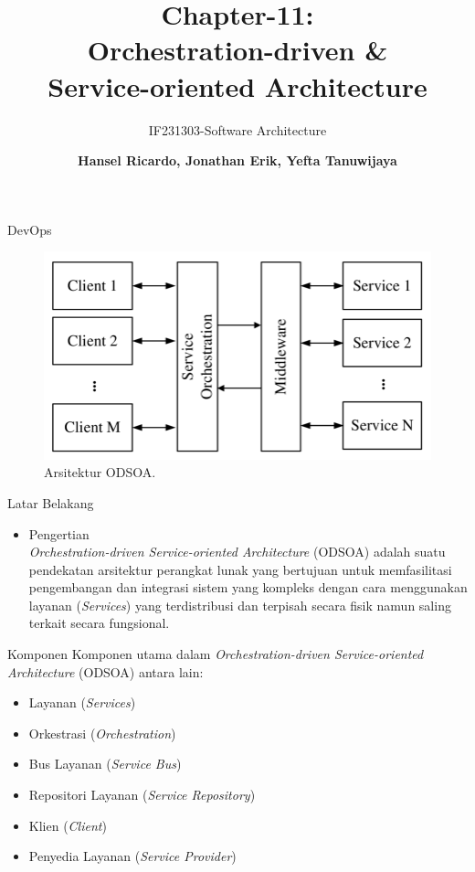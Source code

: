 \documentclass[aspectratio=169, table]{beamer}
\title{Chapter-11:\\Orchestration-driven \&\\Service-oriented Architecture}
\subtitle{IF231303-Software Architecture}
\author{\textbf{Hansel Ricardo, Jonathan Erik, Yefta Tanuwijaya}}
\begin{document}
	\begin{frame}[plain]
		\maketitle
	\end{frame}

	\begin{frame}{DevOps}
		\begin{figure}[h]
			\centering
			\includegraphics[width=\textwidth]{ODSOA}
			\caption{Arsitektur ODSOA.}
			\label{fig:Arsitektur ODSOA}
		\end{figure}
	\end{frame}

	\begin{frame}{Latar Belakang}
		\begin{itemize}
			\item Pengertian
			\\\textit{Orchestration-driven Service-oriented Architecture} (ODSOA) adalah suatu pendekatan arsitektur perangkat lunak yang bertujuan untuk memfasilitasi pengembangan dan integrasi sistem yang kompleks dengan cara menggunakan layanan (\textit{Services}) yang terdistribusi dan terpisah secara fisik namun saling terkait secara fungsional.
		\end{itemize}
	\end{frame}

	\begin{frame}{Komponen}
		Komponen utama dalam \textit{Orchestration-driven Service-oriented Architecture} (ODSOA) antara lain:
		\begin{itemize}
			\item Layanan (\textit{Services})
			\item Orkestrasi (\textit{Orchestration})
			\item Bus Layanan (\textit{Service Bus})
			\item Repositori Layanan (\textit{Service Repository})
			\item Klien (\textit{Client})
			\item Penyedia Layanan (\textit{Service Provider})

		\end{itemize}
	\end{frame}
\end{document}
